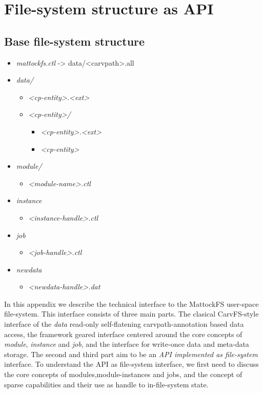 \chapter{File-system structure as API}
\section{Base file-system structure} 
\begin{itemize}
  \item \emph{mattockfs.ctl} -> data/<carvpath>.all 
  \item \emph{data/} 
  \begin{itemize}
    \item \emph{<cp-entity>.<ext>} 
    \item \emph{<cp-entity>/} 
    \begin{itemize}
      \item \emph{<cp-entity>.<ext>}
      \item \emph{<cp-entity>} 
    \end{itemize}
  \end{itemize}
  \item \emph{module/}
  \begin{itemize}
    \item \emph{<module-name>.ctl}
  \end{itemize}
  \item \emph{instance}
  \begin{itemize}
    \item \emph{<instance-handle>.ctl}
  \end{itemize}
  \item \emph{job}
  \begin{itemize}
    \item \emph{<job-handle>.ctl}
  \end{itemize}
  \item \emph{newdata}
  \begin{itemize}
    \item \emph{<newdata-handle>.dat}
  \end{itemize} 
\end{itemize}
In this appendix we describe the technical interface to the MattockFS user-space file-system. This interface consists of three main parts. The clasical CarvFS-style interface of the \emph{data} read-only self-flatening carvpath-annotation based data access, the framework geared interface centered around the core concepts of \emph{module}, \emph{instance} and \emph{job}, and the interface for write-once data and meta-data storage. The second and third part aim to be an \emph{API implemented as file-system} interface. To understand the API as file-system interface, we first need to discuss the core concepts of modules,module-instances and jobs, and the concept of sparse capabilities and their use as handle to in-file-system state.
